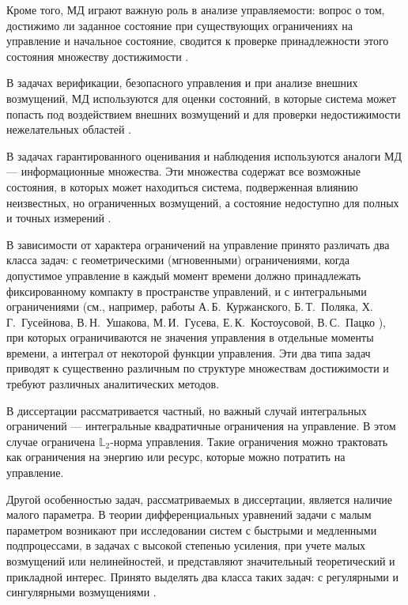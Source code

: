 \documentclass[../abstract.tex]{subfiles}
\begin{document}
Кроме того, МД играют важную роль в анализе управляемости: вопрос о том, достижимо ли заданное состояние при существующих ограничениях на управление и начальное состояние, сводится к проверке принадлежности этого состояния множеству достижимости \cite{Kur1, Kurzhanski1977}.

В задачах верификации, безопасного управления и при анализе внешних возмущений, МД используются для оценки состояний, в которые система может попасть под воздействием внешних возмущений и для проверки недостижимости нежелательных областей \cite{Mitchell, Filippova2015}. 

В задачах гарантированного оценивания и наблюдения используются аналоги МД --- информационные множества. 
Эти множества содержат все возможные состояния, в которых может находиться система, подверженная влиянию неизвестных, но ограниченных возмущений, а состояние недоступно для полных и точных измерений \cite{Kurzhanski1977, Kur1, Schweppe, bi2000, Patsko2019}.

В зависимости от характера ограничений на управление принято различать два класса задач: с геометрическими (мгновенными) ограничениями, когда допустимое управление в каждый момент времени должно принадлежать фиксированному компакту в пространстве управлений, и с интегральными ограничениями (см., например, работы А.\,Б.~Куржанского, Б.\,Т.~Поляка, Х.\,Г.~Гусейнова, В.\,Н.~Ушакова, М.\,И.~Гусева, Е.\,К.~Костоусовой, В.\,С.~Пацко \cite{Kur1, Polyak2004, Guseinov2007, Guseinov2009, Guseinov2010, Guseinov2024, GusZyk, Kostousova,Patsko2023}), при которых ограничиваются не значения управления в отдельные моменты времени, а интеграл от некоторой функции управления. 
Эти два типа задач приводят к существенно различным по структуре множествам достижимости и требуют различных аналитических методов.

В диссертации рассматривается частный, но важный случай интегральных ограничений --- интегральные квадратичные ограничения на управление. 
В этом случае ограничена $\mathbb{L}_2$-норма управления. 
Такие ограничения можно трактовать как ограничения на энергию или ресурс, которые можно потратить на управление. 

Другой особенностью задач, рассматриваемых в диссертации, является наличие малого параметра. 
В теории дифференциальных уравнений задачи с малым параметром возникают при исследовании систем с быстрыми и медленными подпроцессами, в задачах с высокой степенью усиления, при учете малых возмущений или нелинейностей, и представляют значительный теоретический и прикладной интерес. 
Принято выделять два класса таких задач: с регулярными и сингулярными возмущениями \cite{Tihonov1948,Tihonov1952}.
\end{document}

